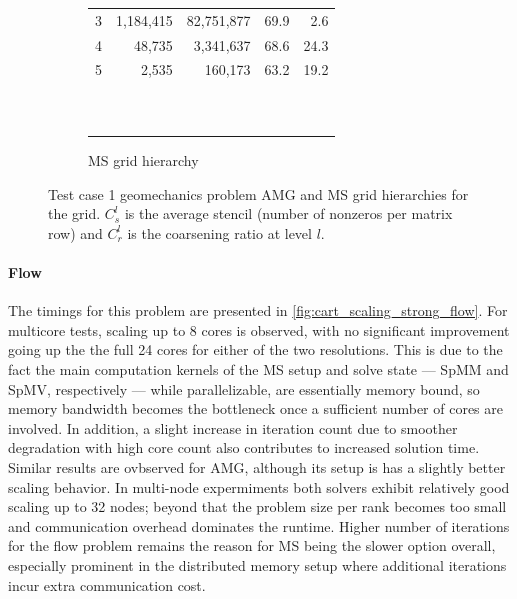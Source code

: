 \begin{figure} [htbp]
\begin{subfigure}[t]{0.48\textwidth}
\begin{tabular}{rrrrr}
			3 &  1,184,415 &    82,751,877 & 69.9 &  2.6 \\
			4 &     48,735 &     3,341,637 & 68.6 & 24.3 \\
			5 &      2,535 &       160,173 & 63.2 & 19.2 \\
			                                             \\
			                                             \\
			                                             \\
			                                             \\
			                                             \\
			                                             \\
			                                             \\
			                                             \\
			                                             \\
      \hline\noalign{\smallskip}
    \end{tabular}
    \caption{MS grid hierarchy}
  \end{subfigure}
  \caption[Test case 1 geomechanics problem grid hierarchies]{Test case 1 geomechanics problem AMG and MS grid hierarchies for the  grid.   $C_s^l$ is the average stencil (number of nonzeros per matrix row) and $C_r^l$ is the coarsening ratio at level $l$.}
  \label{fig:cart_grid_hierarchies}
\end{figure}

\paragraph{Flow}
The timings for this problem are presented in \cref{fig:cart_scaling_strong_flow}.   For multicore tests, scaling up to 8 cores is observed, with no significant improvement going up the the full 24 cores for either of the two resolutions.   This is due to the fact the main computation kernels of the MS setup and solve state --- SpMM and SpMV, respectively --- while parallelizable, are essentially memory bound, so memory bandwidth becomes the bottleneck once a sufficient number of cores are involved.    In addition, a slight increase in iteration count due to smoother degradation with high core count also contributes to increased solution time.   Similar results are ovbserved for AMG, although its setup is has a slightly better scaling behavior.   In multi-node expermiments both solvers exhibit relatively good scaling up to 32 nodes; beyond that the problem size per rank becomes too small and communication overhead dominates the runtime.   Higher number of iterations for the flow problem remains the reason for MS being the slower option overall, especially prominent in the distributed memory setup where additional iterations incur extra communication cost.

